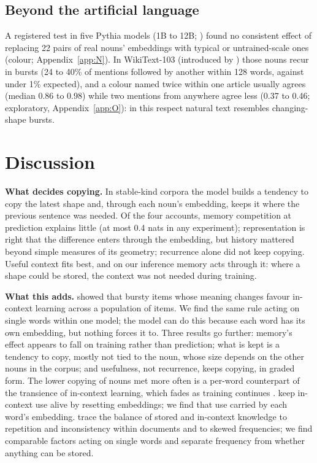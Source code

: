 \documentclass[11pt]{article}
\begin{document}
\subsection{Beyond the artificial language}\label{sec:pythia}
A registered test in five Pythia models (1B to 12B; \citealp{biderman2023}) found no consistent effect of replacing 22 pairs of real nouns' embeddings with typical or untrained-scale ones (colour; Appendix~\ref{app:N}). In WikiText-103 (introduced by \citealp{merity2017}) those nouns recur in bursts (24 to 40\% of mentions followed by another within 128 words, against under 1\% expected), and a colour named twice within one article usually agrees (median 0.86 to 0.98) while two mentions from anywhere agree less (0.37 to 0.46; exploratory, Appendix~\ref{app:O}): in this respect natural text resembles changing-shape bursts.


\section{Discussion}\label{sec:discussion}
\textbf{What decides copying.} In stable-kind corpora the model builds a tendency to copy the latest shape and, through each noun's embedding, keeps it where the previous sentence was needed. Of the four accounts, memory competition at prediction explains little (at most 0.4 nats in any experiment); representation is right that the difference enters through the embedding, but history mattered beyond simple measures of its geometry; recurrence alone did not keep copying. Useful context fits best, and on our inference memory acts through it: where a shape could be stored, the context was not needed during training.

\textbf{What this adds.} \citet{chan2022} showed that bursty items whose meaning changes favour in-context learning across a population of items. We find the same rule acting on single words within one model; the model can do this because each word has its own embedding, but nothing forces it to. Three results go further: memory's effect appears to fall on training rather than prediction; what is kept is a tendency to copy, mostly not tied to the noun, whose size depends on the other nouns in the corpus; and usefulness, not recurrence, keeps copying, in graded form. The lower copying of nouns met more often is a per-word counterpart of the transience of in-context learning, which fades as training continues \citep{singh2023}. \citet{anand2025} keep in-context use alive by resetting embeddings; we find that use carried by each word's embedding. \citet{kim2026training} trace the balance of stored and in-context knowledge to repetition and inconsistency within documents and to skewed frequencies; we find comparable factors acting on single words and separate frequency from whether anything can be stored.
\end{document}
